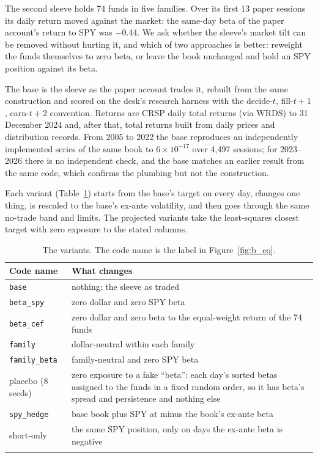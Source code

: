 \documentclass[10pt, a4paper, twocolumn]{article}
\renewcommand{\toprule}{\arrayrulecolor{qnavy}\specialrule{\heavyrulewidth}{\abovetopsep}{\belowrulesep}\arrayrulecolor{black}}
\renewcommand{\bottomrule}{\arrayrulecolor{qnavy}\specialrule{\heavyrulewidth}{\aboverulesep}{\belowbottomsep}\arrayrulecolor{black}}
\newcommand{\qstripes}{\rowcolors{2}{qstripe}{white}}
\newcommand{\qhead}[1]{\textbf{\color{qnavy}#1}}
\newcommand{\qsource}[1]{\par\vspace{1pt}{\footnotesize\color{black!60}\textit{Source:} #1}\par}
\begin{document}
The second sleeve holds 74 funds in five families. Over its first 13 paper sessions its daily return moved against the market: the same-day beta of the paper account's return to SPY was $-$0.44. We ask whether the sleeve's market tilt can be removed without hurting it, and which of two approaches is better: reweight the funds themselves to zero beta, or leave the book unchanged and hold an SPY position against its beta.

The base is the sleeve as the paper account trades it, rebuilt from the same construction and scored on the desk's research harness with the decide-$t$, fill-$t{+}1$, earn-$t{+}2$ convention. Returns are CRSP daily total returns (via WRDS) to 31 December 2024 and, after that, total returns built from daily prices and distribution records. From 2005 to 2022 the base reproduces an independently implemented series of the same book to $6\times10^{-17}$ over 4,497 sessions; for 2023--2026 there is no independent check, and the base matches an earlier result from the same code, which confirms the plumbing but not the construction.

Each variant (Table~\ref{tab:b_var}) starts from the base's target on every day, changes one thing, is rescaled to the base's ex-ante volatility, and then goes through the same no-trade band and limits. The projected variants take the least-squares closest target with zero exposure to the stated columns.

\begin{table}[H]
\centering
\caption{The variants. The code name is the label in Figure~\ref{fig:b_eq}.}
\label{tab:b_var}
\footnotesize
\qstripes
\begin{tabularx}{\columnwidth}{@{}l>{\raggedright\arraybackslash}X@{}}
\toprule
\qhead{Code name} & \qhead{What changes} \\
\midrule
\texttt{base} & nothing: the sleeve as traded \\
\texttt{beta\_spy} & zero dollar and zero SPY beta \\
\texttt{beta\_cef} & zero dollar and zero beta to the equal-weight return of the 74 funds \\
\texttt{family} & dollar-neutral within each family \\
\texttt{family\_beta} & family-neutral and zero SPY beta \\
placebo (8 seeds) & zero exposure to a fake ``beta'': each day's sorted betas assigned to the funds in a fixed random order, so it has beta's spread and persistence and nothing else \\
\texttt{spy\_hedge} & base book plus SPY at minus the book's ex-ante beta \\
short-only & the same SPY position, only on days the ex-ante beta is negative \\
\bottomrule
\end{tabularx}
\qsource{Study design.}
\end{table}
\end{document}
